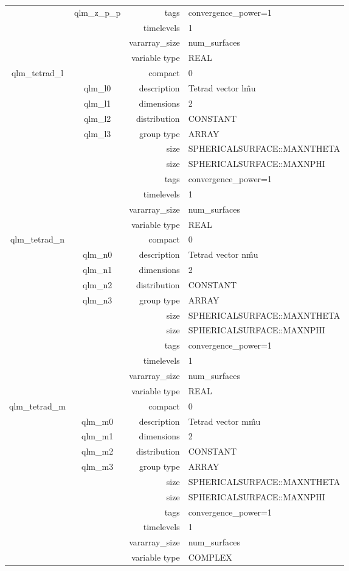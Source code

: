 \begin{tabular*}{150mm}{|c|c@{\extracolsep{\fill}}|rl|}
 & qlm\_z\_p\_p & tags & convergence\_power=1 \\ 
 &  & timelevels & 1 \\ 
 &  & vararray\_size & num\_surfaces \\ 
 &  & variable type & REAL \\ 
\hline 
qlm\_tetrad\_l &  & compact & 0 \\ 
 & qlm\_l0 & description & Tetrad vector l\^mu \\ 
 & qlm\_l1 & dimensions & 2 \\ 
 & qlm\_l2 & distribution & CONSTANT \\ 
 & qlm\_l3 & group type & ARRAY \\ 
 &  & size & SPHERICALSURFACE::MAXNTHETA \\ 
& ~ & size & SPHERICALSURFACE::MAXNPHI \\ 
 &  & tags & convergence\_power=1 \\ 
 &  & timelevels & 1 \\ 
 &  & vararray\_size & num\_surfaces \\ 
 &  & variable type & REAL \\ 
\hline 
qlm\_tetrad\_n &  & compact & 0 \\ 
 & qlm\_n0 & description & Tetrad vector n\^mu \\ 
 & qlm\_n1 & dimensions & 2 \\ 
 & qlm\_n2 & distribution & CONSTANT \\ 
 & qlm\_n3 & group type & ARRAY \\ 
 &  & size & SPHERICALSURFACE::MAXNTHETA \\ 
& ~ & size & SPHERICALSURFACE::MAXNPHI \\ 
 &  & tags & convergence\_power=1 \\ 
 &  & timelevels & 1 \\ 
 &  & vararray\_size & num\_surfaces \\ 
 &  & variable type & REAL \\ 
\hline 
qlm\_tetrad\_m &  & compact & 0 \\ 
 & qlm\_m0 & description & Tetrad vector m\^mu \\ 
 & qlm\_m1 & dimensions & 2 \\ 
 & qlm\_m2 & distribution & CONSTANT \\ 
 & qlm\_m3 & group type & ARRAY \\ 
 &  & size & SPHERICALSURFACE::MAXNTHETA \\ 
& ~ & size & SPHERICALSURFACE::MAXNPHI \\ 
 &  & tags & convergence\_power=1 \\ 
 &  & timelevels & 1 \\ 
 &  & vararray\_size & num\_surfaces \\ 
 &  & variable type & COMPLEX \\ 
\hline 
\end{tabular*} 



